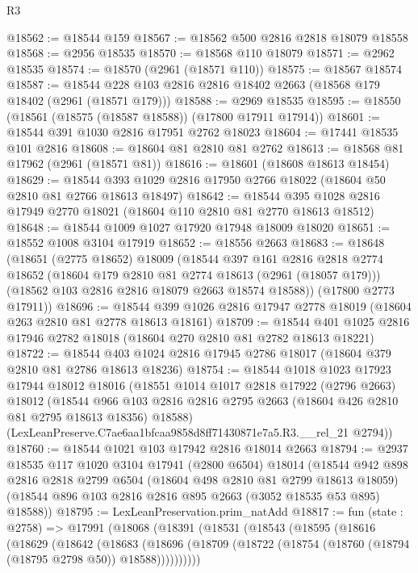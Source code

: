 \begin{lexlean}{R3}
\begin{coremodule}
@18562 := @18544 @159
@18567 := @18562 @500 @2816 @2818 @18079 @18558
@18568 := @2956 @18535
@18570 := @18568 @110 @18079
@18571 := @2962 @18535
@18574 := @18570 (@2961 (@18571 @110))
@18575 := @18567 @18574
@18587 := @18544 @228 @103 @2816 @2816 @18402 @2663 (@18568 @179 @18402 (@2961 (@18571 @179)))
@18588 := @2969 @18535
@18595 := @18550 (@18561 (@18575 (@18587 @18588)) (@17800 @17911 @17914))
@18601 := @18544 @391 @1030 @2816 @17951 @2762 @18023
@18604 := @17441 @18535 @101 @2816
@18608 := @18604 @81 @2810 @81 @2762
@18613 := @18568 @81 @17962 (@2961 (@18571 @81))
@18616 := @18601 (@18608 @18613 @18454)
@18629 := @18544 @393 @1029 @2816 @17950 @2766 @18022 (@18604 @50 @2810 @81 @2766 @18613 @18497)
@18642 := @18544 @395 @1028 @2816 @17949 @2770 @18021 (@18604 @110 @2810 @81 @2770 @18613 @18512)
@18648 := @18544 @1009 @1027 @17920 @17948 @18009 @18020
@18651 := @18552 @1008 @3104 @17919
@18652 := @18556 @2663
@18683 := @18648
    (@18651
      (@2775 @18652)
      @18009
      (@18544
        @397
        @161
        @2816
        @2818
        @2774
        @18652
        (@18604 @179 @2810 @81 @2774 @18613 (@2961 (@18057 @179)))
        (@18562 @103 @2816 @2816 @18079 @2663 @18574 @18588))
      (@17800 @2773 @17911))
@18696 := @18544 @399 @1026 @2816 @17947 @2778 @18019 (@18604 @263 @2810 @81 @2778 @18613 @18161)
@18709 := @18544 @401 @1025 @2816 @17946 @2782 @18018 (@18604 @270 @2810 @81 @2782 @18613 @18221)
@18722 := @18544 @403 @1024 @2816 @17945 @2786 @18017 (@18604 @379 @2810 @81 @2786 @18613 @18236)
@18754 := @18544
    @1018
    @1023
    @17923
    @17944
    @18012
    @18016
    (@18551
      @1014
      @1017
      @2818
      @17922
      (@2796 @2663)
      @18012
      (@18544 @966 @103 @2816 @2816 @2795 @2663 (@18604 @426 @2810 @81 @2795 @18613 @18356) @18588)
      (LexLeanPreserve.C7ae6aa1bfcaa9858d8ff71430871e7a5.R3.__rel_21 @2794))
@18760 := @18544 @1021 @103 @17942 @2816 @18014 @2663
@18794 := @2937
    @18535
    @117
    @1020
    @3104
    @17941
    (@2800 @6504)
    @18014
    (@18544
      @942
      @898
      @2816
      @2818
      @2799
      @6504
      (@18604 @498 @2810 @81 @2799 @18613 @18059)
      (@18544 @896 @103 @2816 @2816 @895 @2663 (@3052 @18535 @53 @895) @18588))
@18795 := LexLeanPreservation.prim_natAdd
@18817 := fun (state : @2758) =>
  @17991
    (@18068
      (@18391
        (@18531
          (@18543
            (@18595
              (@18616
                (@18629
                  (@18642
                    (@18683
                      (@18696
                        (@18709 (@18722 (@18754 (@18760 (@18794 (@18795 @2798 @50)) @18588))))))))))

\end{coremodule}
\end{lexlean}
